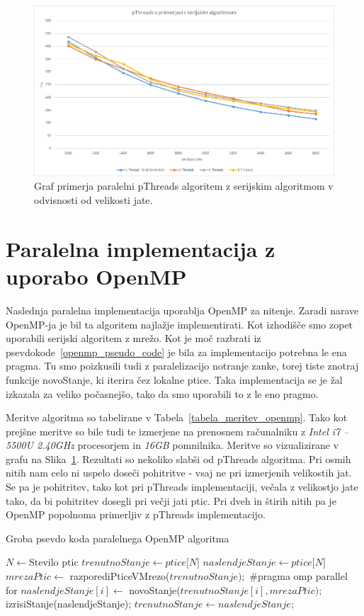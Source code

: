 \documentclass[a4paper, 12pt]{book}
\begin{document}
\begin{figure}[t]
\includegraphics[width=\textwidth]{graf_pthreads}
\caption{Graf primerja paralelni pThreads algoritem z serijskim algoritmom v odvisnosti od velikosti jate.}
\label{img:graf_pthreads}
\centering
\end{figure}

\chapter{Paralelna implementacija z uporabo OpenMP}
\label{ch3}
Naslednja paralelna implementacija uporablja OpenMP za nitenje. Zaradi narave OpenMP-ja je bil ta algoritem najlažje implementirati. Kot izhodišče smo zopet uporabili serijski algoritem z mrežo. Kot je moč razbrati iz psevdokode~\ref{openmp_pseudo_code} je bila za implementacijo potrebna le ena pragma. Tu smo poizkusili tudi z paralelizacijo notranje zanke, torej tiste znotraj funkcije novoStanje, ki iterira čez lokalne ptice. Taka implementacija se je žal izkazala za veliko počasnejšo, tako da smo uporabili to z le eno pragmo.

Meritve algoritma so tabelirane v Tabela~\ref{tabela_meritev_openmp}. Tako kot prejšne meritve so bile tudi te izmerjene na prenosnem računalniku z \textit{Intel i7 – 5500U 2.40GHz} procesorjem in \textit{16GB} pomnilnika. Meritve so vizualizirane v grafu na Slika~\ref{img:graf_pthreads}. Rezultati so nekoliko slabši od pThreads algoritma. Pri osmih nitih nam celo ni uspelo doseči pohitritve - vsaj ne pri izmerjenih velikostih jat. Se pa je pohitritev, tako kot pri pThreads implementaciji, večala z velikostjo jate tako, da bi pohitritev dosegli pri večji jati ptic. Pri dveh in štirih nitih pa je OpenMP popolnoma primerljiv z pThreads implementacijo.

\begin{algorithm}
\caption{Groba psevdo koda paralelnega OpenMP algoritma}\label{openmp_pseudo_code}
\begin{algorithmic}[1]
\State $N \gets \text{Stevilo ptic}$
\State $trenutnoStanje \gets \textit{ptice[N]}$
\State $naslendjeStanje \gets \textit{ptice[N]}$
\Loop
\State $mrezaPtic \gets$ razporediPticeVMrezo($trenutnoStanje);$
\State \#pragma omp parallel for
\State $naslendjeStanje[i] \gets$ novoStanje($trenutnoStanje[i], mrezaPtic);$
\EndFor
\State izrisiStanje(naslendjeStanje);
\State $trenutnoStanje \gets naslendjeStanje;$
\EndLoop
\end{algorithmic}
\end{algorithm}
\end{document}
